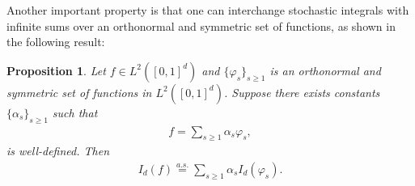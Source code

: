 \documentclass[11pt,reqno]{amsart}
\numberwithin{equation}{section}
\newtheorem{prop}{Proposition}[section]
\theoremstyle{definition}
\begin{document}
Another important property is that one can interchange stochastic integrals with infinite sums over an orthonormal and symmetric set of functions, as shown in the following result: 
\begin{prop}\label{prop:I2-f_E} 
Let $f \in L^2([0, 1]^d)$ and $\{\varphi_s\}_{s \geq 1}$ is an orthonormal and symmetric set of functions in  $L^2([0, 1]^d)$. Suppose there exists constants $\{\alpha_s\}_{s \geq 1}$ such that
\begin{align*}
f = \sum_{s \geq 1} \alpha_s \varphi_s,
\end{align*}
is well-defined. Then 
\begin{align}\label{eq:exchangeId}
I_d(f) \stackrel{a.s.}= \sum_{s \geq 1}  \alpha_s I_d(\varphi_s).
\end{align}

\end{prop}
\end{document}
